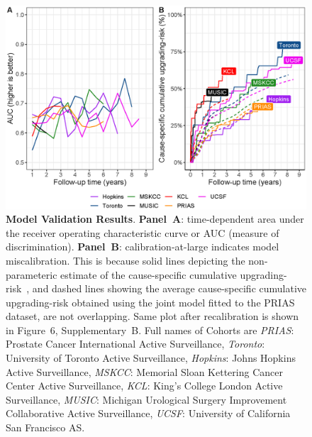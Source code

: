 \begin{figure}
\centerline{\includegraphics[width=\columnwidth]{images/auc_beforecalib.eps}}
\caption{\textbf{Model Validation Results}. \textbf{Panel~A}: time-dependent area under the receiver operating characteristic curve or AUC (measure of discrimination). \textbf{Panel~B}: calibration-at-large indicates model miscalibration. This is because solid lines depicting the non-parameteric estimate of the cause-specific cumulative upgrading-risk~\citep{turnbull1976empirical}, and dashed lines showing the average cause-specific cumulative upgrading-risk obtained using the joint model fitted to the PRIAS dataset, are not overlapping. Same plot after recalibration is shown in Figure~6, Supplementary~B. Full names of Cohorts are \textit{PRIAS}: Prostate Cancer International Active Surveillance, \textit{Toronto}: University of Toronto Active Surveillance, \textit{Hopkins}: Johns Hopkins Active Surveillance, \textit{MSKCC}: Memorial Sloan Kettering Cancer Center Active Surveillance, \textit{KCL}: King's College London Active Surveillance, \textit{MUSIC}: Michigan Urological Surgery Improvement Collaborative Active Surveillance, \textit{UCSF}: University of California San Francisco AS.}
\label{fig:auc_beforecalib}
\end{figure}

